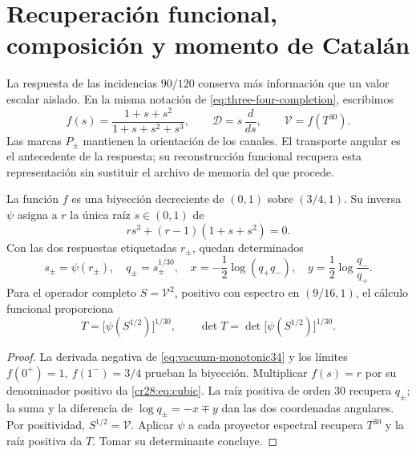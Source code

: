 \section{Recuperación funcional, composición y momento de Catalán}
\label{cr28:sec:restitucion-constitutiva}

La respuesta de las incidencias \(90/120\) conserva más información que
un valor escalar aislado. En la misma notación de
\eqref{eq:three-four-completion}, escribimos
\[
 f(s)=\frac{1+s+s^2}{1+s+s^2+s^3},\qquad
 \mathcal D=s\,\frac{d}{ds},\qquad
 \mathcal V=f(T^{30}).
\]
Las marcas \(P_\pm\) mantienen la orientación de los canales. El
transporte angular es el antecedente de la respuesta; su reconstrucción
funcional recupera esta representación sin sustituir el archivo de memoria
del que procede.

\begin{theorem}
\label{cr28:thm:inversion-constitutiva}
La función \(f\) es una biyección decreciente de \((0,1)\) sobre
\((3/4,1)\). Su inversa \(\psi\) asigna a \(r\) la única raíz
\(s\in(0,1)\) de
\begin{equation}
 r s^3+(r-1)(1+s+s^2)=0.
 \label{cr28:eq:cubic}
\end{equation}
Con las dos respuestas etiquetadas \(r_\pm\), quedan determinados
\begin{equation}
 s_\pm=\psi(r_\pm),\quad q_\pm=s_\pm^{1/30},\quad
 x=-\frac12\log(q_+q_-),\quad
 y=\frac12\log\frac{q_-}{q_+}.
 \label{cr28:eq:angular-recovery}
\end{equation}
Para el operador completo \(S=\mathcal V^2\), positivo con espectro
en \((9/16,1)\), el cálculo funcional proporciona
\begin{equation}
 T=\bigl[\psi(S^{1/2})\bigr]^{1/30},\qquad
 \det T=\det\bigl[\psi(S^{1/2})\bigr]^{1/30}.
 \label{cr28:eq:operator-recovery}
\end{equation}
\end{theorem}
\begin{proof}
La derivada negativa de \eqref{eq:vacuum-monotonic34} y los límites
\(f(0^+)=1,\ f(1^-)=3/4\) prueban la biyección. Multiplicar \(f(s)=r\)
por su denominador positivo da \eqref{cr28:eq:cubic}. La raíz positiva
de orden \(30\) recupera \(q_\pm\); la suma y la diferencia de
\(\log q_\pm=-x\mp y\) dan las dos coordenadas angulares. Por
positividad, \(S^{1/2}=\mathcal V\). Aplicar \(\psi\) a cada
proyector espectral recupera \(T^{30}\) y la raíz positiva da \(T\).
Tomar su determinante concluye.
\end{proof}

